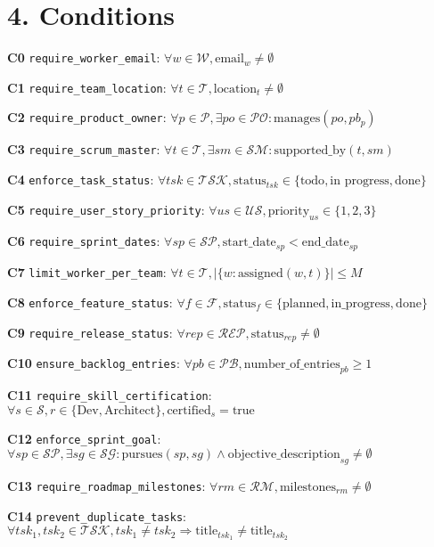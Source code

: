 \documentclass[12pt]{article}
\begin{document}
\section{4. Conditions}
\item[\textbf{C0}] \texttt{require\_worker\_email}: 
    $ \forall w \in \mathcal{W}, \text{email}_w \neq \emptyset $
    \item[\textbf{C1}] \texttt{require\_team\_location}: 
    $ \forall t \in \mathcal{T}, \text{location}_t \neq \emptyset $
    \item[\textbf{C2}] \texttt{require\_product\_owner}: 
    $ \forall p \in \mathcal{P}, \exists po \in \mathcal{PO}: \text{manages}(po, pb_p) $
    \item[\textbf{C3}] \texttt{require\_scrum\_master}: 
    $ \forall t \in \mathcal{T}, \exists sm \in \mathcal{SM}: \text{supported\_by}(t, sm) $
    \item[\textbf{C4}] \texttt{enforce\_task\_status}: 
    $ \forall tsk \in \mathcal{TSK}, \text{status}_{tsk} \in \{\text{todo}, \text{in progress}, \text{done}\} $
    \item[\textbf{C5}] \texttt{require\_user\_story\_priority}: 
    $ \forall us \in \mathcal{US}, \text{priority}_{us} \in \{1,2,3\} $
    \item[\textbf{C6}] \texttt{require\_sprint\_dates}: 
    $ \forall sp \in \mathcal{SP}, \text{start\_date}_{sp} < \text{end\_date}_{sp} $
    \item[\textbf{C7}] \texttt{limit\_worker\_per\_team}: 
    $ \forall t \in \mathcal{T}, |\{w : \text{assigned}(w,t)\}| \leq M $
    \item[\textbf{C8}] \texttt{enforce\_feature\_status}: 
    $ \forall f \in \mathcal{F}, \text{status}_f \in \{\text{planned}, \text{in\_progress}, \text{done}\} $
    \item[\textbf{C9}] \texttt{require\_release\_status}: 
    $ \forall rep \in \mathcal{REP}, \text{status}_{rep} \neq \emptyset $
    \item[\textbf{C10}] \texttt{ensure\_backlog\_entries}: 
    $ \forall pb \in \mathcal{PB}, \text{number\_of\_entries}_{pb} \geq 1 $
    \item[\textbf{C11}] \texttt{require\_skill\_certification}: 
    $ \forall s \in \mathcal{S}, r \in \{\text{Dev}, \text{Architect}\}, \text{certified}_s = \text{true} $
    \item[\textbf{C12}] \texttt{enforce\_sprint\_goal}: 
    $ \forall sp \in \mathcal{SP}, \exists sg \in \mathcal{SG}: \text{pursues}(sp, sg) \land \text{objective\_description}_{sg} \neq \emptyset $
    \item[\textbf{C13}] \texttt{require\_roadmap\_milestones}: 
    $ \forall rm \in \mathcal{RM}, \text{milestones}_{rm} \neq \emptyset $
    \item[\textbf{C14}] \texttt{prevent\_duplicate\_tasks}: 
    $ \forall tsk_1, tsk_2 \in \mathcal{TSK}, tsk_1 \neq tsk_2 \Rightarrow \text{title}_{tsk_1} \neq \text{title}_{tsk_2} $
\end{document}
